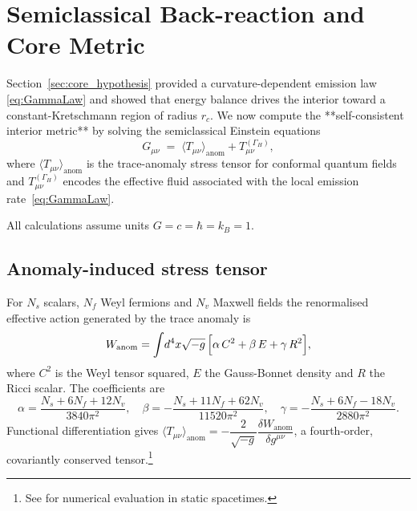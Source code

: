 
\section{Semiclassical Back-reaction and Core Metric}
\label{sec:backreaction}

Section~\ref{sec:core_hypothesis} provided a curvature-dependent emission
law \eqref{eq:GammaLaw} and showed that energy balance drives the interior
toward a constant-Kretschmann region of radius $r_c$.
We now compute the **self-consistent interior metric**
by solving the semiclassical Einstein equations
\begin{equation}
  G_{\mu\nu}
  \;=\;
  \bigl\langle T_{\mu\nu}\bigr\rangle_{\!\text{anom}}
  +T_{\mu\nu}^{(\Gamma_H)} ,
  \label{eq:semiEinstein}
\end{equation}
where $\langle T_{\mu\nu}\rangle_{\text{anom}}$ is the trace-anomaly
stress tensor for conformal quantum fields and
$T_{\mu\nu}^{(\Gamma_H)}$ encodes the effective fluid associated with the
local emission rate~\eqref{eq:GammaLaw}.

All calculations assume units $G=c=\hbar=k_B=1$.

\subsection{Anomaly-induced stress tensor}
\label{sec:anom_tensor}

For $N_s$ scalars, $N_f$ Weyl fermions and $N_v$ Maxwell fields the
renormalised effective action generated by the trace anomaly is
\cite{Christensen1978,BirrellDavies1982}
\begin{equation}
  W_{\text{anom}}
  =\int\!d^{4}x\sqrt{-g}\,
  \Bigl[
    \alpha\,C^{2}
   +\beta\,E
   +\gamma\,R^{2}
  \Bigr],
  \label{eq:Wanom}
\end{equation}
where $C^{2}$ is the Weyl tensor squared,
$E$ the Gauss-Bonnet density and $R$ the Ricci scalar.
The coefficients are
\begin{equation}
  \alpha=\frac{N_s+6N_f+12N_v}{3840\pi^{2}},\quad
  \beta =-\frac{N_s+11N_f+62N_v}{11520\pi^{2}},\quad
  \gamma=-\frac{N_s+6N_f-18N_v}{2880\pi^{2}}.
\end{equation}
Functional differentiation gives
$\langle T_{\mu\nu}\rangle_{\text{anom}}
 = -\dfrac{2}{\sqrt{-g}}\dfrac{\delta W_{\text{anom}}}{\delta g^{\mu\nu}}$,
a fourth-order, covariantly conserved tensor.\footnote{See \cite{AndersonHiscockSamuel1995} for numerical evaluation in static spacetimes.}

